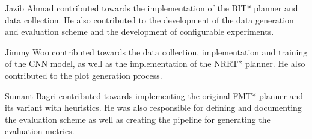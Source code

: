 \documentclass{article}
\begin{document}
    Jazib Ahmad contributed towards the implementation of the BIT* planner and data collection. He also contributed to the development of the data generation and evaluation scheme and the development of configurable experiments.

    Jimmy Woo contributed towards the data collection, implementation and training of the CNN model, as well as the implementation of the NRRT* planner. He also contributed to the plot generation process.

    Sumant Bagri contributed towards implementing the original FMT* planner and its variant with heuristics. He was also responsible for defining and documenting the evaluation scheme as well as creating the pipeline for generating the evaluation metrics. 

\clearpage
\end{document}
